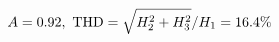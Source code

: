 \documentclass[preview]{standalone}
\begin{document}
\begin{align*}
\special{dvisvgm:raw <g id='unique000'>}A=0.92,\ \text{THD}=\sqrt{H_2^2+H_3^2}/H_1=16.4\%\special{dvisvgm:raw </g>}
\end{align*}
\end{document}
